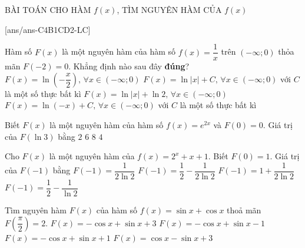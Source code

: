\begin{dang}{BÀI TOÁN CHO HÀM $f(x)$, TÌM NGUYÊN HÀM CỦA $f(x)$}
\end{dang}
[ans/ans-C4B1CD2-LC]
\TN
\begin{ex}%
Hàm số $F(x)$ là một nguyên hàm của hàm số $f(x)=\dfrac{1}{x}$ trên $(-\infty;0)$ thỏa mãn $F(-2)=0$. Khẳng định nào sau đây \textbf{đúng}?
\choice
{\True $F(x)=\ln\left(-\dfrac{x}{2} \right),\,\forall x\in (-\infty;0)$}
{$F(x)=\ln\left|x\right|+C,\,\forall x\in (-\infty;0)$ với $C$ là một số thực bất kì}
{$F(x)=\ln\left|x\right|+\ln 2,\,\forall x\in (-\infty;0)$}
{$F(x)=\ln\left(-x\right)+C,\,\forall x\in (-\infty;0)$ với $C$ là một số thực bất kì}
\end{ex}

\begin{ex}%
Biết $F(x)$ là một nguyên hàm của hàm số $f(x)=e^{2x}$ và $F(0)=0$. Giá trị của $F(\ln 3)$ bằng
\choice
{$2$}
{$6$}
{$8$}
{\True $4$}
\end{ex}

\begin{ex}%
Cho $F(x)$ là một nguyên hàm của $f(x)=2^x+x+1$. Biết $F(0)=1$. Giá trị của $F(-1)$ bằng
\choice
{$F(-1)=\dfrac{1}{2\ln 2}$}
{\True $F(-1)=\dfrac{1}{2}-\dfrac{1}{2\ln 2}$}
{$F(-1)=1+\dfrac{1}{2\ln 2}$}
{$F(-1)=\dfrac{1}{2}-\dfrac{1}{\ln 2}$}
\end{ex}

\begin{ex}%
Tìm nguyên hàm $F(x)$ của hàm số $f(x)=\sin x+\cos x$ thoả mãn $F\left(\dfrac{\pi}{2}\right)=2$.
\choice
{$F(x)=-\cos x+\sin x+3$}
{$F(x)=-\cos x+\sin x-1$}
{\True $F(x)=-\cos x+\sin x+1$}
{$F(x)=\cos x-\sin x+3$}
\end{ex}

